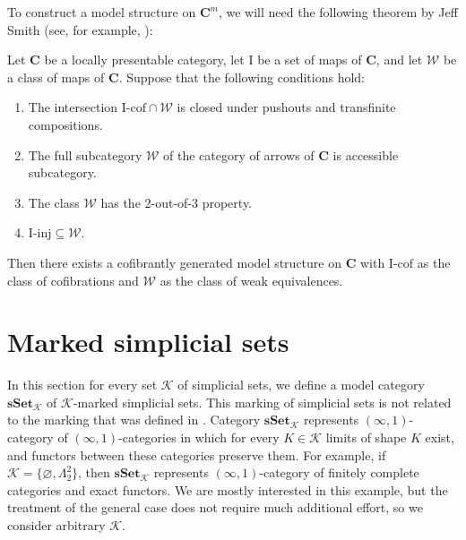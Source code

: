 \documentclass[reqno]{amsart}
\theoremstyle{definition}
\theoremstyle{remark}
\newcommand{\cat}[1]{\mathbf{#1}}
\newcommand{\C}{\cat{C}}
\newcommand{\sSet}{\cat{sSet}}
\newcommand{\lc}{lc}
\newcommand{\lcc}{lcc}
\newcommand{\mlc}{\mathrm{\lc}}
\newcommand{\mlcc}{\mathrm{\lcc}}
\newcommand{\K}{$\mathcal{K}$}
\newcommand{\csSet}{\sSet_\mathcal{K}}
\newcommand{\lcsSet}{\sSet^\mlc}
\newcommand{\lccsSet}{\sSet^\mlcc}
\newcommand{\we}{\mathcal{W}}
\newcommand{\I}{\mathrm{I}}
\newcommand{\class}[2]{#1\text{-}\mathrm{#2}}
\newcommand{\Icof}[1][\I]{\class{#1}{cof}}
\newcommand{\Iinj}[1][\I]{\class{#1}{inj}}
\numberwithin{figure}{section}
\begin{document}
To construct a model structure on $\C^m$, we will need the following theorem by Jeff Smith (see, for example, \cite[Proposition~A.2.6.8]{lurie-topos}):
\begin{thm}
Let $\C$ be a locally presentable category, let $\I$ be a set of maps of $\C$, and let $\we$ be a class of maps of $\C$.
Suppose that the following conditions hold:
\begin{enumerate}
\item The intersection $\Icof \cap \we$ is closed under pushouts and transfinite compositions.
\item The full subcategory $\we$ of the category of arrows of $\C$ is accessible subcategory.
\item The class $\we$ has the 2-out-of-3 property.
\item $\Iinj \subseteq \we$.
\end{enumerate}
Then there exists a cofibrantly generated model structure on $\C$ with $\Icof$ as the class of cofibrations and $\we$ as the class of weak equivalences.
\end{thm}

\section{Marked simplicial sets}

In this section for every set $\mathcal{K}$ of simplicial sets, we define a model category $\csSet$ of \K-marked simplicial sets.
This marking of simplicial sets is not related to the marking that was defined in \cite{lurie-topos}.
Category $\csSet$ represents $(\infty,1)$-category of $(\infty,1)$-categories in which for every $K \in \mathcal{K}$ limits of shape $K$ exist, and functors between these categories preserve them.
For example, if $\mathcal{K} = \{ \varnothing, \Lambda^2_2 \}$, then $\csSet$ represents $(\infty,1)$-category of finitely complete categories and exact functors.
We are mostly interested in this example, but the treatment of the general case does not require much additional effort, so we consider arbitrary $\mathcal{K}$.

\begin{comment}
In this section we define model categories $\lcsSet$ and $\lccsSet$ of \lc- and \lcc-marked simplicial sets.
These model categories represent $(\infty,1)$-categories of locally caretesian (that is, finitely complete) and locally cartesian closed $(\infty,1)$-categories respectively.
Objects of $\lcsSet$ and $\lccsSet$ are simplicial sets in which certain simplices are marked.
To distinguish these marking from each other and from marking defined in \cite{lurie-topos}, we call such simplicial sets \lc-marked and \lcc-marked.
\end{comment}
\end{document}
